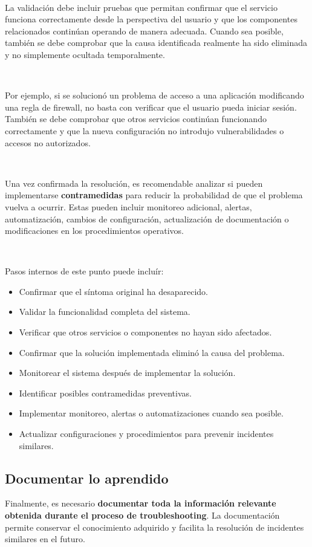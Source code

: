 \documentclass[a4paper,10pt]{article}
\begin{document}
\

La validación debe incluir pruebas que permitan confirmar que el servicio funciona correctamente desde la perspectiva del usuario y que los componentes relacionados continúan operando de manera adecuada. 
Cuando sea posible, también se debe comprobar que la causa identificada realmente ha sido eliminada y no simplemente ocultada temporalmente.

\

Por ejemplo, si se solucionó un problema de acceso a una aplicación modificando una regla de firewall, 
no basta con verificar que el usuario pueda iniciar sesión. También se debe comprobar que otros servicios continúan funcionando correctamente y que la nueva configuración no introdujo vulnerabilidades o accesos no autorizados.

\

Una vez confirmada la resolución, es recomendable analizar si pueden implementarse \textbf{contramedidas} para reducir la probabilidad de que el problema vuelva a ocurrir. 
Estas pueden incluir monitoreo adicional, alertas, automatización, cambios de configuración, actualización de documentación o modificaciones en los procedimientos operativos.

\

Pasos internos de este punto puede incluír:

\begin{itemize}
    \item Confirmar que el síntoma original ha desaparecido.
    \item Validar la funcionalidad completa del sistema.
    \item Verificar que otros servicios o componentes no hayan sido afectados.
    \item Confirmar que la solución implementada eliminó la causa del problema.
    \item Monitorear el sistema después de implementar la solución.
    \item Identificar posibles contramedidas preventivas.
    \item Implementar monitoreo, alertas o automatizaciones cuando sea posible.
    \item Actualizar configuraciones y procedimientos para prevenir incidentes similares.
\end{itemize}

\subsection{Documentar lo aprendido}
Finalmente, es necesario \textbf{documentar toda la información relevante obtenida durante el proceso de troubleshooting}. 
La documentación permite conservar el conocimiento adquirido y facilita la resolución de incidentes similares en el futuro.
\end{document}

